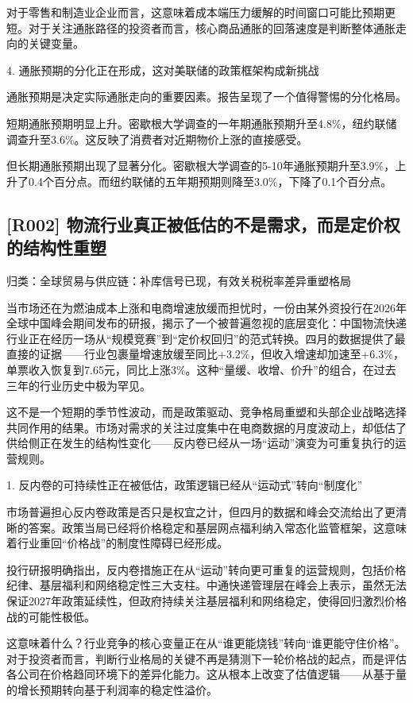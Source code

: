 \documentclass[11pt]{ctexart}
\begin{document}
对于零售和制造业企业而言，这意味着成本端压力缓解的时间窗口可能比预期更短。对于关注通胀路径的投资者而言，核心商品通胀的回落速度是判断整体通胀走向的关键变量。

4. 通胀预期的分化正在形成，这对美联储的政策框架构成新挑战

通胀预期是决定实际通胀走向的重要因素。报告呈现了一个值得警惕的分化格局。

短期通胀预期明显上升。密歇根大学调查的一年期通胀预期升至4.8\%，纽约联储调查升至3.6\%。这反映了消费者对近期物价上涨的直接感受。

但长期通胀预期出现了显著分化。密歇根大学调查的5-10年通胀预期升至3.9\%，上升了0.4个百分点。而纽约联储的五年期预期则降至3.0\%，下降了0.1个百分点。

\subsection{[R002] 物流行业真正被低估的不是需求，而是定价权的结构性重塑}
{\small\color{refgray}归类：全球贸易与供应链：补库信号已现，有效关税税率差异重塑格局}

当市场还在为燃油成本上涨和电商增速放缓而担忧时，一份由某外资投行在2026年全球中国峰会期间发布的研报，揭示了一个被普遍忽视的底层变化：中国物流快递行业正在经历一场从“规模竞赛”到“定价权回归”的范式转换。四月的数据提供了最直接的证据——行业包裹量增速放缓至同比+3.2\%，但收入增速却加速至+6.3\%，单票收入恢复到7.65元，同比上涨3\%。这种“量缓、收增、价升”的组合，在过去三年的行业历史中极为罕见。

这不是一个短期的季节性波动，而是政策驱动、竞争格局重塑和头部企业战略选择共同作用的结果。市场对需求的关注过度集中在电商数据的月度波动上，却低估了供给侧正在发生的结构性变化——反内卷已经从一场“运动”演变为可重复执行的运营规则。

1. 反内卷的可持续性正在被低估，政策逻辑已经从“运动式”转向“制度化”

市场普遍担心反内卷政策是否只是权宜之计，但四月的数据和峰会交流给出了更清晰的答案。政策当局已经将价格稳定和基层网点福利纳入常态化监管框架，这意味着行业重回“价格战”的制度性障碍已经形成。

投行研报明确指出，反内卷措施正在从“运动”转向更可重复的运营规则，包括价格纪律、基层福利和网络稳定性三大支柱。中通快递管理层在峰会上表示，虽然无法保证2027年政策延续性，但政府持续关注基层福利和网络稳定，使得回归激烈价格战的可能性极低。

这意味着什么？行业竞争的核心变量正在从“谁更能烧钱”转向“谁更能守住价格”。对于投资者而言，判断行业格局的关键不再是猜测下一轮价格战的起点，而是评估各公司在价格趋同环境下的差异化能力。这从根本上改变了估值逻辑——从基于量的增长预期转向基于利润率的稳定性溢价。
\end{document}
